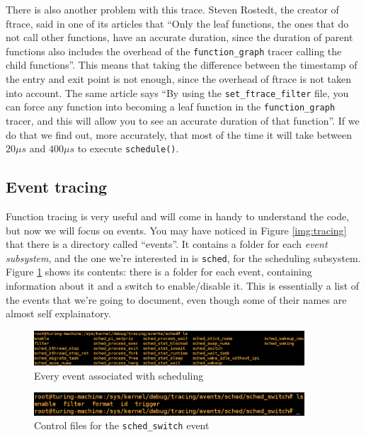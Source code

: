 There is also another problem with this trace. Steven Rostedt, the creator of ftrace, said in one of its articles that ``Only the leaf functions, the ones that do not call other functions, have an accurate duration, since the duration of parent functions also includes the overhead of the \verb|function_graph| tracer calling the child functions''.\cite{secrets} This means that taking the difference between the timestamp of the entry and exit point is not enough, since the overhead of ftrace is not taken into account. The same article says ``By using the \verb|set_ftrace_filter| file, you can force any function into becoming a leaf function in the \verb|function_graph| tracer, and this will allow you to see an accurate duration of that function''. If we do that we find out, more accurately, that most of the time it will take between $20 \mu s$ and $400\mu s$ to execute \verb|schedule()|.

\subsection{Event tracing}
Function tracing is very useful and will come in handy to understand the code, but now we will focus on events. You may have noticed in Figure \ref{img:tracing} that there is a directory called ``events''. It contains a folder for each \textit{event subsystem}, and the one we're interested in is \verb|sched|, for the scheduling subsystem. Figure \ref{img:sched} shows its contents: there is a folder for each event, containing information about it and a switch to enable/disable it. This is essentially a list of the events that we're going to document, even though some of their names are almost self explainatory.

\begin{figure}[ht]
\centering
\includegraphics[width=0.9\textwidth]{images/shell_sched.png}
\caption{Every event associated with scheduling}
\label{img:sched}
\end{figure}

\begin{figure}[ht]
\centering
\includegraphics[width=0.9\textwidth]{images/shell_sched_event.png} 
\caption{Control files for the \texttt{sched\_switch} event}
\label{img:sched_event}
\end{figure}

